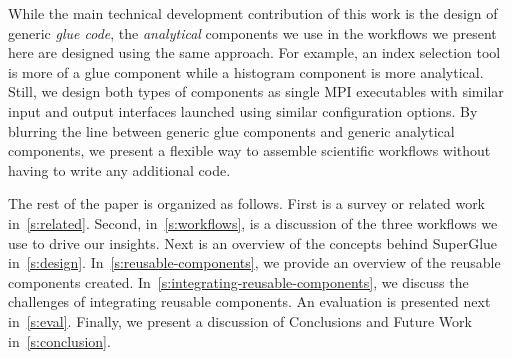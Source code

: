 While the main technical development contribution of this work is the design of
generic {\em glue code}, the {\em analytical} components we use in the
workflows we present here are designed using the same approach. For example, an
index selection tool is more of a glue component while a histogram component is
more analytical.  Still, we design both types of components as single MPI
executables with similar input and output interfaces launched using similar
configuration options.  By blurring the line between generic glue components
and generic analytical components, we present a flexible way to assemble
scientific workflows without having to write any additional code. 
\fi

The rest of the paper is organized as follows. First is a survey or related
work in~\autoref{s:related}. Second, in~\autoref{s:workflows}, is a
discussion of the three workflows we use to drive our insights. Next is an
overview of the concepts behind SuperGlue in~\autoref{s:design}.
In~\autoref{s:reusable-components}, we provide an overview of the reusable
components created. In~\autoref{s:integrating-reusable-components}, we
discuss the challenges of integrating reusable components.  An evaluation is
presented next in~\autoref{s:eval}. Finally, we present a discussion of Conclusions
and Future Work in~\autoref{s:conclusion}.

